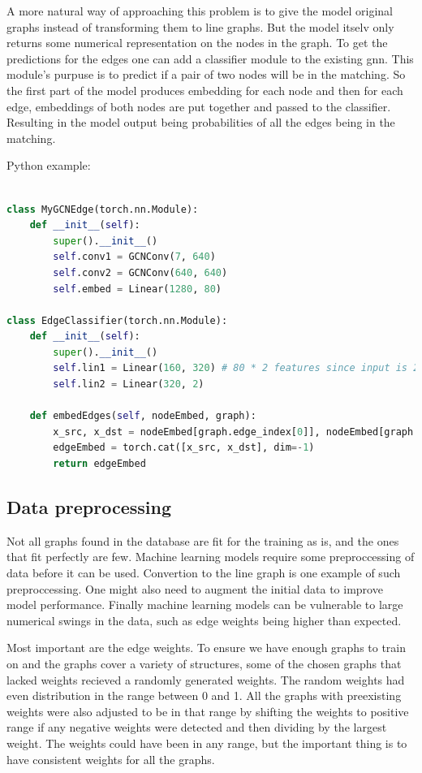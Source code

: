 A more natural way of approaching this problem is to give the model original graphs instead of transforming them to line graphs. But the model itselv only returns some numerical representation on the nodes in the graph. To get the predictions for the edges one can add a classifier module to the existing \gls{gnn}. This module's purpuse is to predict if a pair of two nodes will be in the matching. So the first part of the model produces embedding for each node and then for each edge, embeddings of both nodes are put together and passed to the classifier. Resulting in the model output being probabilities of all the edges being in the matching.

Python example:

\begin{lstlisting}[language=Python]

class MyGCNEdge(torch.nn.Module):
    def __init__(self):
        super().__init__()
        self.conv1 = GCNConv(7, 640)
        self.conv2 = GCNConv(640, 640)
        self.embed = Linear(1280, 80)

class EdgeClassifier(torch.nn.Module):
    def __init__(self):
        super().__init__()
        self.lin1 = Linear(160, 320) # 80 * 2 features since input is 2 nodes.
        self.lin2 = Linear(320, 2)

    def embedEdges(self, nodeEmbed, graph):
        x_src, x_dst = nodeEmbed[graph.edge_index[0]], nodeEmbed[graph.edge_index[1]]
        edgeEmbed = torch.cat([x_src, x_dst], dim=-1)        
        return edgeEmbed

\end{lstlisting}

\subsection{Data preprocessing}
\label{sec:preprocessing}
Not all graphs found in the database are fit for the training as is, and the ones that fit perfectly are few. Machine learning models require some preproccessing of data before it can be used. Convertion to the line graph is one example of such preproccessing. One might also need to augment the initial data to improve model performance. Finally machine learning models can be vulnerable to large numerical swings in the data, such as edge weights being higher than expected.

Most important are the edge weights. To ensure we have enough graphs to train on and the graphs cover a variety of structures, some of the chosen graphs that lacked weights recieved a randomly generated weights. The random weights had even distribution in the range between 0 and 1. All the graphs with preexisting weights were also adjusted to be in that range by shifting the weights to positive range if any negative weights were detected and then dividing by the largest weight. The weights could have been in any range, but the important thing is to have consistent weights for all the graphs. 

